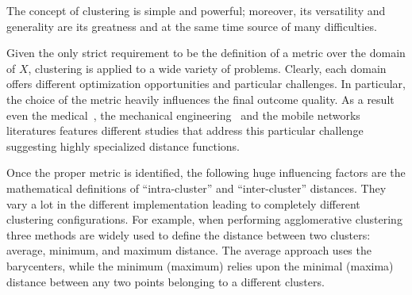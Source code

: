 The concept of clustering is simple and powerful; moreover, its versatility
and generality are its greatness and at the same time source of many difficulties.


Given the only strict requirement to be the definition of a metric over the
domain of $X$, clustering is applied to a wide variety of problems.
Clearly, each domain offers different optimization opportunities and
particular challenges.
In particular, the choice of the metric heavily influences the final outcome quality.
As a result even the medical~\cite{siless2013comparison}, the mechanical
engineering~\cite{wilding2011clustering} and the mobile networks~\cite{cheng2009stability}
literatures features different studies that address this particular challenge
suggesting highly specialized distance functions.


Once the proper metric is identified, the following huge influencing factors
are the mathematical definitions of ``intra-cluster'' and ``inter-cluster''
distances. They vary a lot in the different implementation leading to
completely different clustering configurations.
For example, when performing agglomerative clustering three methods
are widely used to define the distance between two clusters:
average, minimum, and maximum distance.
The average approach uses the barycenters, while the minimum (maximum)
relies upon the minimal (maxima) distance between any two points
belonging to a different clusters.




